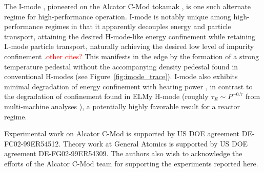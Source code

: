 \documentclass[12pt,floatfix,showpacs]{revtex4-1}
\newcommand{\note}[1]{\textcolor{red}{#1}}
\begin{document}
The I-mode \cite{Whyte2010,Hubbard2011,Walk2014,Walk2014b}, pioneered on the Alcator C-Mod tokamak \cite{Hutchinson1994}, is one such alternate regime for high-performance operation.  
I-mode is notably unique among high-performance regimes in that it apparently decouples energy and particle transport, attaining the desired H-mode-like energy confinement while retaining L-mode particle transport, naturally achieving the desired low level of impurity confinement \cite{Howard2011}.\note{other cites?}  
This manifests in the edge by the formation of a strong temperature pedestal without the accompanying density pedestal found in conventional H-modes (see Figure~\ref{fig:imode_trace}).  
I-mode also exhibits minimal degradation of energy confinement with heating power \cite{Whyte2010,Dominguez2012,Walk2014b}, in contrast to the degradation of confinement found in ELMy H-mode (roughly $\tau_E \sim P^{-0.7}$ from multi-machine analyses \cite{Christiansen1992,ITER1999}), a potentially highly favorable result for a reactor regime.




\begin{acknowledgments}
 Experimental work on Alcator C-Mod is supported by US DOE agreement DE-FC02-99ER54512. Theory work at General Atomics is supported by US DOE agreement DE-FG02-99ER54309.  The authors also wish to acknowledge the efforts of the Alcator C-Mod team for supporting the experiments reported here.
\end{acknowledgments}



\end{document}

